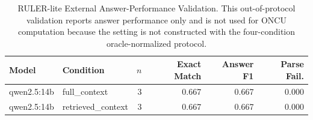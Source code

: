 \begin{table}[!t]
\renewcommand{\arraystretch}{1.10}
\caption{RULER-lite External Answer-Performance Validation. This out-of-protocol validation reports answer performance only and is not used for ONCU computation because the setting is not constructed with the four-condition oracle-normalized protocol.}
\label{tab:ruler_lite_external_validation}
\centering
\scriptsize
\setlength{\tabcolsep}{3pt}
\begin{tabular}{llrrrr}
\toprule
Model & Condition & $n$ & Exact Match & Answer F1 & Parse Fail. \\
\midrule
qwen2.5:14b & full\_context & 3 & 0.667 & 0.667 & 0.000 \\
qwen2.5:14b & retrieved\_context & 3 & 0.667 & 0.667 & 0.000 \\
\bottomrule
\end{tabular}
\end{table}
